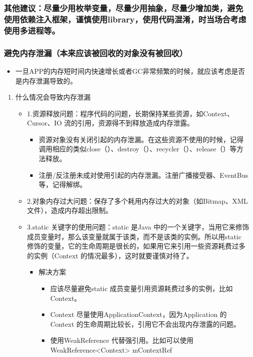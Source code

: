 \documentclass[9pt, b5paper]{article}
\begin{document}
\subsubsection{其他建议：尽量少用枚举变量，尽量少用抽象，尽量少增加类，避免使用依赖注入框架，谨慎使用library，使用代码混淆，时当场合考虑使用多进程等。}
\label{sec-1-1-6}
\subsubsection{避免内存泄漏（本来应该被回收的对象没有被回收）}
\label{sec-1-1-7}
\begin{itemize}
\item 一旦APP的内存短时间内快速增长或者GC非常频繁的时候，就应该考虑是否是内存泄漏导致的。
\end{itemize}
\begin{enumerate}
\item 什么情况会导致内存泄漏
\label{sec-1-1-7-1}
\begin{itemize}
\item 1.资源释放问题：程序代码的问题，长期保持某些资源，如Context、Cursor、IO 流的引用，资源得不到释放造成内存泄露。 
\begin{itemize}
\item 资源对象没有关闭引起的内存泄漏。在这些资源不使用的时候，记得调用相应的类似close（）、destroy（）、recycler（）、release（）等方法释放。
\item 注册/反注册未成对使用引起的内存泄漏。注册广播接受器、EventBus等，记得解绑。
\end{itemize}
\item 2.对象内存过大问题：保存了多个耗用内存过大的对象（如Bitmap、XML 文件），造成内存超出限制。
\item 3.static 关键字的使用问题：static 是Java 中的一个关键字，当用它来修饰成员变量时，那么该变量就属于该类，而不是该类的实例。所以用static 修饰的变量，它的生命周期是很长的，如果用它来引用一些资源耗费过多的实例（Context 的情况最多），这时就要谨慎对待了。
\begin{itemize}
\item 解决方案
\begin{itemize}
\item 应该尽量避免static 成员变量引用资源耗费过多的实例，比如Context。
\item Context 尽量使用ApplicationContext，因为Application 的Context 的生命周期比较长，引用它不会出现内存泄露的问题。
\item 使用WeakReference 代替强引用。比如可以使用WeakReference<Context> mContextRef
\end{itemize}

\end{itemize}
\end{itemize}
\end{enumerate}
\end{document}
